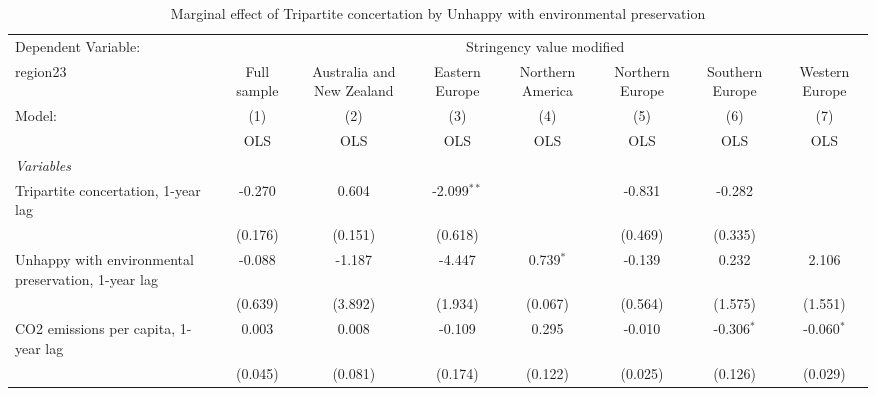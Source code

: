
\begin{table}[htbp]
   \caption{Marginal effect of Tripartite concertation by Unhappy with environmental preservation}
   \centering
   \begin{tabular}{lccccccc}
      \toprule
      Dependent Variable: & \multicolumn{7}{c}{Stringency value modified}\\
      region23                                                                                  & Full sample   & Australia and New Zealand & Eastern Europe & Northern America & Northern Europe & Southern Europe & Western Europe \\   
      Model:                                                                                    & (1)           & (2)                       & (3)            & (4)              & (5)             & (6)             & (7)\\  
                                                                                                &  OLS          & OLS                       & OLS            & OLS              & OLS             & OLS             & OLS\\  
      \midrule
      \emph{Variables}\\
      Tripartite concertation, 1-year lag                                                       & -0.270        & 0.604                     & -2.099$^{**}$  &                  & -0.831          & -0.282          &   \\   
                                                                                                & (0.176)       & (0.151)                   & (0.618)        &                  & (0.469)         & (0.335)         &   \\   
      Unhappy with environmental preservation, 1-year lag                                       & -0.088        & -1.187                    & -4.447         & 0.739$^{*}$      & -0.139          & 0.232           & 2.106\\   
                                                                                                & (0.639)       & (3.892)                   & (1.934)        & (0.067)          & (0.564)         & (1.575)         & (1.551)\\   
      CO2 emissions per capita, 1-year lag                                                      & 0.003         & 0.008                     & -0.109         & 0.295            & -0.010          & -0.306$^{*}$    & -0.060$^{*}$\\   
                                                                                                & (0.045)       & (0.081)                   & (0.174)        & (0.122)          & (0.025)         & (0.126)         & (0.029)\\   

\end{tabular}
\end{table}
